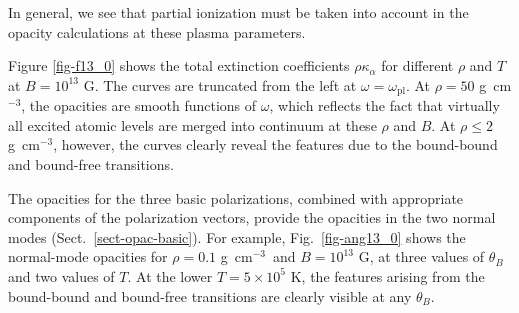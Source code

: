 \documentclass{emulateapj}
\newcommand{\gcc}{\mbox{g cm$^{-3}$}}
\begin{document}
In general, we see that 
partial ionization must be taken into account
in the opacity calculations at these plasma parameters.

Figure \ref{fig-f13_0} shows the total extinction coefficients
$\rho\kappa_\alpha$
for different $\rho$ and $T$ at $B=10^{13}$ G.
The curves are truncated from the left at $\omega = \omega_\mathrm{pl}$.
At $\rho = 50$ \gcc, the opacities
are smooth functions of $\omega$, which reflects the fact 
that virtually all excited atomic levels 
are merged into continuum at these $\rho$ and $B$.
At $\rho\leq2$ \gcc, however, the curves clearly reveal
the features due to the bound-bound and bound-free
transitions.

The opacities for the three basic polarizations,
combined with appropriate components of the polarization 
vectors, provide the opacities in the two normal modes
(Sect.\ \ref{sect-opac-basic}). For example,
Fig.\ \ref{fig-ang13_0} shows the normal-mode opacities 
for $\rho=0.1$ \gcc\ and $B=10^{13}$ G,
at three values of $\theta_B$ and two values of $T$.
At the lower $T=5\times10^5$ K, the features 
arising from the bound-bound and bound-free transitions
are clearly visible at any $\theta_B$.

\end{document}
